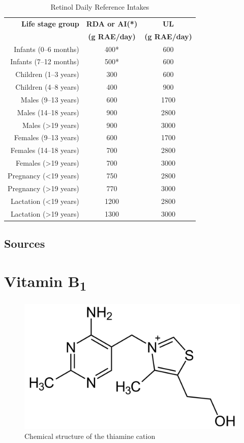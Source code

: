 \documentclass{book}
\begin{document}
\begin{table}[h]
	\caption{Retinol Daily Reference Intakes}
	\centering \begin{tabular}{| r | c | c |}
		\hline
		\textbf{Life stage group} & \textbf{RDA or AI(*)} & \textbf{UL}\\
		& \textbf{(\textmu g RAE/day)} & \textbf{(\textmu g RAE/day)}\\ \hline
		Infants (0--6 months) & 400* & 600\\ \hline
		Infants (7--12 months) & 500* & 600\\ \hline
		Children (1--3 years) & 300 & 600\\ \hline
		Children (4--8 years) & 400 & 900\\ \hline
		Males (9--13 years) & 600 & 1700\\ \hline
		Males (14--18 years) & 900 & 2800\\ \hline
		Males (\textgreater19 years) & 900 & 3000\\ \hline
		Females (9--13 years) & 600 & 1700\\ \hline
		Females (14--18 years) & 700 & 2800\\ \hline
		Females (\textgreater19 years) & 700 & 3000\\ \hline
		Pregnancy (\textless19 years) & 750 & 2800\\ \hline
		Pregnancy (\textgreater19 years) & 770 & 3000\\ \hline
		Lactation (\textless19 years) & 1200 & 2800\\ \hline
		Lactation (\textgreater19 years) & 1300 & 3000\\ \hline
	\end{tabular}
\end{table}
\newpage

\section{Sources}


\chapter{Vitamin B\textsubscript{1}}
\begin{figure}[h]
	\caption{Chemical structure of  the thiamine cation}
	\centering \includegraphics[width=\textwidth]{images/Vitamin_B1_chemical_structure}
\end{figure}
\newpage
\end{document}

